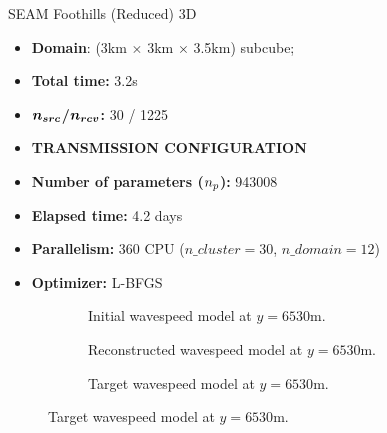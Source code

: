 \begin{frame}{SEAM Foothills (Reduced) 3D}

  \vspace{-0.6cm}
   \begin{multicols}{2}

     \begin{itemize}
       \scriptsize
    \item \textbf{Domain}: (3km $\times$ 3km $\times$ 3.5km) subcube;
    \item \textbf{Total time:} 3.2s
    \item \textbf{$\boldsymbol{{n_{src}}}$/$\boldsymbol{{n_{rcv}}}$:} 30 / 1225
    \item \textbf{TRANSMISSION CONFIGURATION}
      \columnbreak
    \item \textbf{Number of parameters (${n_{p}}$):} 943008
    \item \textbf{Elapsed time:} 4.2 days
    \item \textbf{Parallelism:} 360 CPU ($n\_cluster=30$, $n\_domain=12$)
    \item \textbf{Optimizer:} L-BFGS
     \end{itemize}
   \end{multicols}
     \scriptsize
     \setlength{\modelwidth}{4.5cm}

\begin{figure}[!htbp]
\begin{subfigure}{0.3\textwidth}
\renewcommand{\modelfile}{image/seam0_y1}

\caption*{\scriptsize{Initial wavespeed model  at $y=6530$m.}}
\end{subfigure}
\begin{subfigure}{0.3\textwidth}
\renewcommand{\modelfile}{image/seam1_y1}

\caption*{\scriptsize{Reconstructed wavespeed model at $y=6530$m.}}
\end{subfigure}
\begin{subfigure}{0.3\textwidth}
  \vspace{-0.4cm}
\renewcommand{\modelfile}{image/seam2_y1}
\renewcommand{\cmapmin}{2000}
\renewcommand{\cmapmax}{6000}

\vspace{-0.8cm}
\caption*{\scriptsize{Target wavespeed model at $y=6530$m.}}
\end{subfigure}
\end{figure}
\end{frame}


